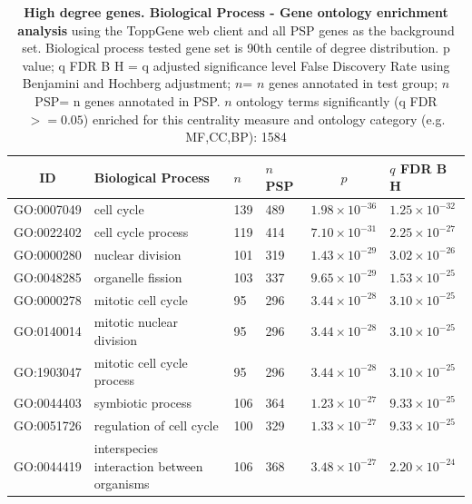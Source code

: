 \begin{table}[ht]
\centering
\begin{adjustbox}{width=\textwidth}
\setlength{\extrarowheight}{2pt}
\begin{tabular}{@{}clllcl@{}}
  \toprule
  ID & Biological Process & $n$ & $n$ PSP & $p$ & $q$ FDR B H \\ 

  \midrule
GO:0007049 & cell cycle & 139 & 489 & $1.98 \times 10^{-36}$ & $1.25 \times 10^{-32}$ \\ 
  GO:0022402 & cell cycle process & 119 & 414 & $7.10 \times 10^{-31}$ & $2.25 \times 10^{-27}$ \\ 
  GO:0000280 & nuclear division & 101 & 319 & $1.43 \times 10^{-29}$ & $3.02 \times 10^{-26}$ \\ 
  GO:0048285 & organelle fission & 103 & 337 & $9.65 \times 10^{-29}$ & $1.53 \times 10^{-25}$ \\ 
  GO:0000278 & mitotic cell cycle & 95 & 296 & $3.44 \times 10^{-28}$ & $3.10 \times 10^{-25}$ \\ 
  GO:0140014 & mitotic nuclear division & 95 & 296 & $3.44 \times 10^{-28}$ & $3.10 \times 10^{-25}$ \\ 
  GO:1903047 & mitotic cell cycle process & 95 & 296 & $3.44 \times 10^{-28}$ & $3.10 \times 10^{-25}$ \\ 
  GO:0044403 & symbiotic process & 106 & 364 & $1.23 \times 10^{-27}$ & $9.33 \times 10^{-25}$ \\ 
  GO:0051726 & regulation of cell cycle & 100 & 329 & $1.33 \times 10^{-27}$ & $9.33 \times 10^{-25}$ \\ 
  GO:0044419 & interspecies interaction between organisms & 106 & 368 & $3.48 \times 10^{-27}$ & $2.20 \times 10^{-24}$ \\ 
   \bottomrule
\end{tabular}
\end{adjustbox}
\caption[Gene ontology enrichment Biological Process of genes above 90th centile of degree distribution]{\textbf{High degree genes. Biological Process - Gene ontology enrichment analysis} using the ToppGene web client and all PSP genes as the background set.  Biological process tested gene set is 90th centile of degree distribution.  p value; q FDR B H = q adjusted significance level False Discovery Rate using Benjamini and Hochberg adjustment; $n$= $n$ genes annotated in test group; $n$ PSP= n genes annotated in PSP. $n$ ontology terms significantly (q FDR$>=0.05$) enriched for this centrality measure and ontology category (e.g. MF,CC,BP): 1584} 

\label{tab:ToppGENE GO: Biological Process. 90 centile cwpsp.txtp = p value; q FDR B H = q adjusted significance level False Discovery Rate using Benjamini and Hochberg adjustment; n= n genes annotated in test group; n PSP= n genes annotated in PSP. n significant in category 1584}
\end{table}


